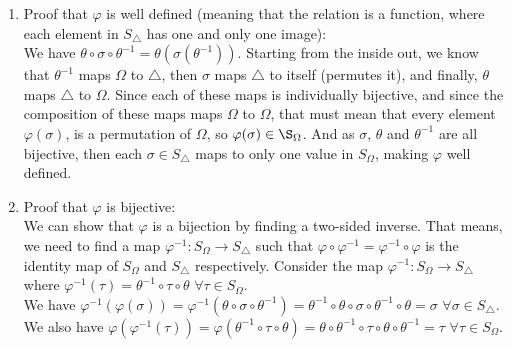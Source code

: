 \documentclass{article}
\begin{document}
    \begin{enumerate}[label=\textbf{\alph*.}]
        \item 
            Proof that $\varphi$ is well defined
            (meaning that the relation is a function, where each
            element in $S_\triangle$ has one and only one image): \\
            We have $\theta \circ \sigma \circ \theta^{-1}
            = \theta(\sigma(\theta^{-1}))$.
            Starting from the inside out,
            we know that $\theta^{-1}$ maps $\Omega$ to $\triangle$,
            then $\sigma$ maps $\triangle$ to itself (permutes it),
            and finally, $\theta$ maps $\triangle$ to $\Omega$.
            Since each of these maps is individually bijective,
            and since the composition of these maps maps $\Omega$
            to $\Omega$,
            that must mean that every element $\varphi(\sigma)$,
            is a permutation of $\Omega$,
            so  $\varphi(\sigma) \in \S_\Omega$.
            And as $\sigma$, $\theta$ and $\theta^{-1}$ are all bijective,
            then each $\sigma \in S_\triangle$ maps to only one value
            in $S_\Omega$,
            making $\varphi$ well defined.
        \item
            Proof that $\varphi$ is bijective: \\
            We can show that $\varphi$ is a bijection by finding a two-sided
            inverse.
            That means, we need to find a map
            $\varphi^{-1}: S_\Omega \to S_\triangle$
            such that $\varphi \circ \varphi^{-1}
            = \varphi^{-1} \circ \varphi$ is the identity map of 
            $S_\Omega$ and $S_\triangle$ respectively.
            Consider the map $\varphi^{-1}: S_\Omega \to S_\triangle$
            where $\varphi^{-1}(\tau)
            = \theta^{-1} \circ \tau \circ \theta$
            $\forall \tau \in S_\Omega$. \\
            We have $\varphi^{-1}(\varphi(\sigma))
            = \varphi^{-1}(\theta \circ \sigma \circ \theta^{-1})
            = \theta^{-1} \circ \theta \circ \sigma \circ \theta^{-1}
            \circ \theta
            = \sigma$ $\forall \sigma \in S_\triangle$. \\
            We also have $\varphi(\varphi^{-1}(\tau))
            = \varphi(\theta^{-1} \circ \tau \circ \theta)
            = \theta \circ \theta^{-1} \circ \tau \circ \theta
            \circ \theta^{-1}
            = \tau$ $\forall \tau \in S_\Omega$. \\

\end{enumerate}
\end{document}
